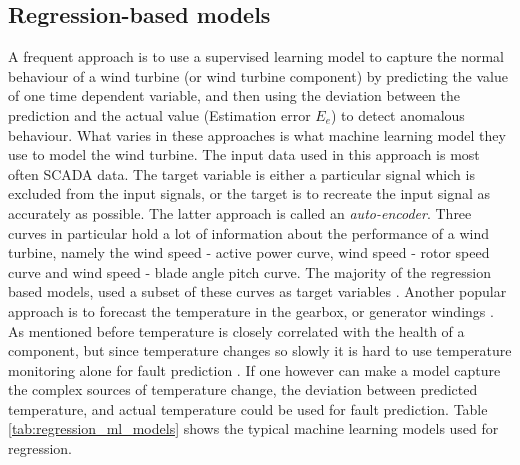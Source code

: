 \subsection{Regression-based models}
A frequent approach is to use a supervised learning model to capture the normal behaviour of a wind turbine (or wind turbine component) by predicting the value of one time dependent variable, and then using the deviation between the prediction and the actual value (Estimation error $E_e$) to detect anomalous behaviour. What varies in these approaches is what machine learning model they use to model the wind turbine. The input data used in this approach is most often SCADA data. The target variable is either a particular signal which is excluded from the input signals, or the target is to recreate the input signal as accurately as possible. The latter approach is called an \textit{auto-encoder}. Three curves in particular hold a lot of information about the performance of a wind turbine, namely the wind speed - active power curve, wind speed - rotor speed curve and wind speed - blade angle pitch curve. The majority of the regression based models, used a subset of these curves as target variables \cite{perf_mon_of_wt_using_extreme_func_theory, GP_operational_curve_monitoring, high_freq_scada_perf_monit_sensitivity, abnormal_detection_scada_data_mining, improved_power_curve_monitoring_of_wt, SVR_blade_pitch_curve_cm, health_cond_model_nn_proportional_hazard_models}. Another popular approach is to forecast the temperature in the gearbox, or generator windings \cite{AD_and_fault_analysis_wt_DAE, health_cond_model_nn_proportional_hazard_models, detecting_malfunctions_wt_generator_bearings_generic_vs_specific_models, CBPM_ABPM_maintainance_model, wt_gearbox_bearing_temp_KS_CNN, DBN_chicken_swarm_optim}. As mentioned before temperature is closely correlated with the health of a component, but since temperature changes so slowly it is hard to use temperature monitoring alone for fault prediction \cite{wt_cm_rev_new_trends_chal_2014}. If one however can make a model capture the complex sources of temperature change, the deviation between predicted temperature, and actual temperature could be used for fault prediction. Table \ref{tab:regression_ml_models} shows the typical machine learning models used for regression. 

